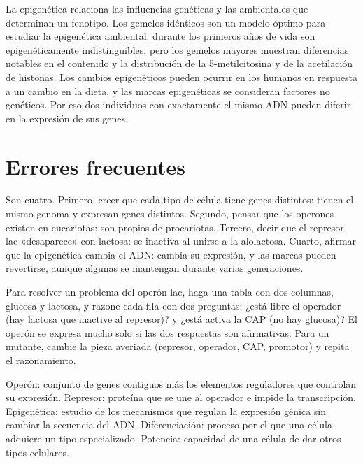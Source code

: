 \documentclass{book}
\begin{document}
La epigenética relaciona las influencias genéticas y las ambientales que determinan un fenotipo. Los gemelos idénticos son un modelo óptimo para estudiar la epigenética ambiental: durante los primeros años de vida son epigenéticamente indistinguibles, pero los gemelos mayores muestran diferencias notables en el contenido y la distribución de la 5-metilcitosina y de la acetilación de histonas. Los cambios epigenéticos pueden ocurrir en los humanos en respuesta a un cambio en la dieta, y las marcas epigenéticas se consideran factores no genéticos. Por eso dos individuos con exactamente el mismo ADN pueden diferir en la expresión de sus genes.


\section{Errores frecuentes}

Son cuatro. Primero, creer que cada tipo de célula tiene genes distintos: tienen el mismo genoma y expresan genes distintos. Segundo, pensar que los operones existen en eucariotas: son propios de procariotas. Tercero, decir que el represor lac «desaparece» con lactosa: se inactiva al unirse a la alolactosa. Cuarto, afirmar que la epigenética cambia el ADN: cambia su expresión, y las marcas pueden revertirse, aunque algunas se mantengan durante varias generaciones.


\begin{tcolorbox}[title={Consejo}, studiumtip, breakable]

Para resolver un problema del operón lac, haga una tabla con dos columnas, glucosa y lactosa, y razone cada fila con dos preguntas: ¿está libre el operador (hay lactosa que inactive al represor)? y ¿está activa la CAP (no hay glucosa)? El operón se expresa mucho solo si las dos respuestas son afirmativas. Para un mutante, cambie la pieza averiada (represor, operador, CAP, promotor) y repita el razonamiento.

\end{tcolorbox}

\begin{tcolorbox}[title={Definición}, studiumdef, breakable]

Operón: conjunto de genes contiguos más los elementos reguladores que controlan su expresión. Represor: proteína que se une al operador e impide la transcripción. Epigenética: estudio de los mecanismos que regulan la expresión génica sin cambiar la secuencia del ADN. Diferenciación: proceso por el que una célula adquiere un tipo especializado. Potencia: capacidad de una célula de dar otros tipos celulares.

\end{tcolorbox}
\end{document}
